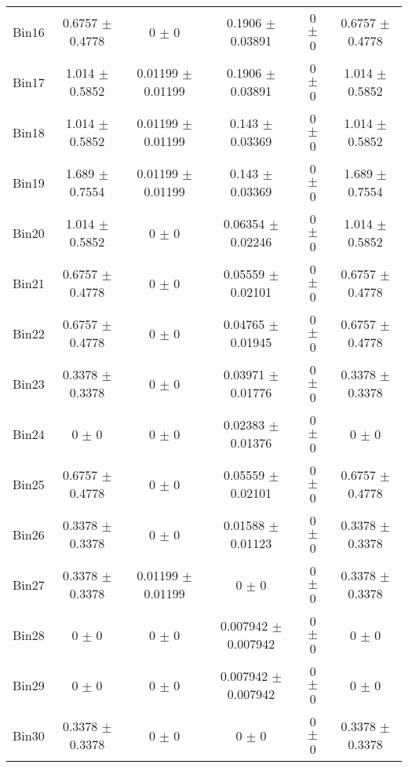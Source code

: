 \begin{tabular}{@{\extracolsep{4pt}}lccccc@{}}
     Bin16 & 0.6757 $\pm$ 0.4778 & 0 $\pm$ 0 & 0.1906 $\pm$ 0.03891 & 0 $\pm$ 0 & 0.6757 $\pm$ 0.4778 \\ 
     Bin17 & 1.014 $\pm$ 0.5852 & 0.01199 $\pm$ 0.01199 & 0.1906 $\pm$ 0.03891 & 0 $\pm$ 0 & 1.014 $\pm$ 0.5852 \\ 
     Bin18 & 1.014 $\pm$ 0.5852 & 0.01199 $\pm$ 0.01199 & 0.143 $\pm$ 0.03369 & 0 $\pm$ 0 & 1.014 $\pm$ 0.5852 \\ 
     Bin19 & 1.689 $\pm$ 0.7554 & 0.01199 $\pm$ 0.01199 & 0.143 $\pm$ 0.03369 & 0 $\pm$ 0 & 1.689 $\pm$ 0.7554 \\ 
     Bin20 & 1.014 $\pm$ 0.5852 & 0 $\pm$ 0 & 0.06354 $\pm$ 0.02246 & 0 $\pm$ 0 & 1.014 $\pm$ 0.5852 \\ 
     Bin21 & 0.6757 $\pm$ 0.4778 & 0 $\pm$ 0 & 0.05559 $\pm$ 0.02101 & 0 $\pm$ 0 & 0.6757 $\pm$ 0.4778 \\ 
     Bin22 & 0.6757 $\pm$ 0.4778 & 0 $\pm$ 0 & 0.04765 $\pm$ 0.01945 & 0 $\pm$ 0 & 0.6757 $\pm$ 0.4778 \\ 
     Bin23 & 0.3378 $\pm$ 0.3378 & 0 $\pm$ 0 & 0.03971 $\pm$ 0.01776 & 0 $\pm$ 0 & 0.3378 $\pm$ 0.3378 \\ 
     Bin24 & 0 $\pm$ 0 & 0 $\pm$ 0 & 0.02383 $\pm$ 0.01376 & 0 $\pm$ 0 & 0 $\pm$ 0 \\ 
     Bin25 & 0.6757 $\pm$ 0.4778 & 0 $\pm$ 0 & 0.05559 $\pm$ 0.02101 & 0 $\pm$ 0 & 0.6757 $\pm$ 0.4778 \\ 
     Bin26 & 0.3378 $\pm$ 0.3378 & 0 $\pm$ 0 & 0.01588 $\pm$ 0.01123 & 0 $\pm$ 0 & 0.3378 $\pm$ 0.3378 \\ 
     Bin27 & 0.3378 $\pm$ 0.3378 & 0.01199 $\pm$ 0.01199 & 0 $\pm$ 0 & 0 $\pm$ 0 & 0.3378 $\pm$ 0.3378 \\ 
     Bin28 & 0 $\pm$ 0 & 0 $\pm$ 0 & 0.007942 $\pm$ 0.007942 & 0 $\pm$ 0 & 0 $\pm$ 0 \\ 
     Bin29 & 0 $\pm$ 0 & 0 $\pm$ 0 & 0.007942 $\pm$ 0.007942 & 0 $\pm$ 0 & 0 $\pm$ 0 \\ 
     Bin30 & 0.3378 $\pm$ 0.3378 & 0 $\pm$ 0 & 0 $\pm$ 0 & 0 $\pm$ 0 & 0.3378 $\pm$ 0.3378 \\ 
\hline\hline
  \end{tabular}
